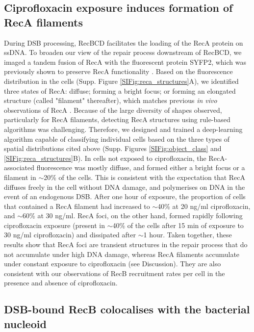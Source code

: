 \subsection*{Ciprofloxacin exposure induces formation of RecA filaments}
During DSB processing, RecBCD facilitates the loading of the RecA protein on ssDNA. To broaden our view of the repair process down\-stream of RecBCD, we imaged a tandem fusion of RecA with the fluorescent protein SYFP2, which was previously shown to preserve RecA functionality \cite{Wiktor2021}. Based on the fluorescence distribution in the cells (Supp. Figure \ref{SIFig:reca_structures}A), we identified three states of RecA: diffuse; forming a bright focus; or forming an elongated structure (called "filament" thereafter), which matches previous \emph{in vivo} observations of RecA \cite{Wiktor2021}. Because of the large diversity of shapes observed, particularly for RecA filaments, detecting RecA structures using rule-based algorithms was challenging. Therefore, we designed and trained a deep-learning algorithm capable of classifying individual cells based on the three types of spatial distributions cited above (Supp. Figures \ref{SIFig:object_class} and \ref{SIFig:reca_structures}B). In cells not exposed to ciprofloxacin, the RecA-associated fluorescence was mostly diffuse, and formed either a bright focus or a filament in $\sim$20\% of the cells. This is consistent with the expectation that RecA diffuses freely in the cell without DNA damage, and polymerises on DNA in the event of an endogenous DSB. After one hour of exposure, the proportion of cells that contained a RecA filament had increased to $\sim$40\% at 20 ng/ml ciprofloxacin, and $\sim$60\% at 30 ng/ml. RecA foci, on the other hand, formed rapidly following ciprofloxacin exposure (present in $\sim$40\% of the cells after 15 min of exposure to 30 ng/ml ciprofloxacin) and dissipated after $\sim$1 hour. Taken together, these results show that RecA foci are transient structures in the repair process that do not accumulate under high DNA damage, whereas RecA filaments accumulate under constant exposure to ciprofloxacin (see Discussion). They are also consistent with our observations of RecB recruitment rates per cell in the presence and absence of ciprofloxacin.

\subsection*{DSB-bound RecB colocalises with the bacterial nucleoid}

